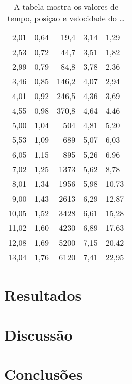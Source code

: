 \documentclass[brazilian,12pt,a4paper,final]{article}
\begin{document}
\begin{table}[h]
\begin{tabular}{||r|r|r||}
2,01    &       0,64    &       19,4    &       3,14    &       1,29    \\
2,53    &       0,72    &       44,7    &       3,51    &       1,82    \\
2,99    &       0,79    &       84,8    &       3,78    &       2,36    \\
3,46    &       0,85    &       146,2   &       4,07    &       2,94    \\
4,01    &       0,92    &       246,5   &       4,36    &       3,69    \\
4,55    &       0,98    &       370,8   &       4,64    &       4,46    \\
5,00    &       1,04    &       504     &       4,81    &       5,20    \\
5,53    &       1,09    &       689     &       5,07    &       6,03    \\
6,05    &       1,15    &       895     &       5,26    &       6,96    \\
7,02    &       1,25    &       1373    &       5,62    &       8,78    \\
8,01    &       1,34    &       1956    &       5,98    &       10,73   \\
9,00    &       1,43    &       2613    &       6,29    &       12,87   \\
10,05   &       1,52    &       3428    &       6,61    &       15,28   \\
11,02   &       1,60    &       4230    &       6,89    &       17,63   \\
12,08   &       1,69    &       5200    &       7,15    &       20,42   \\
13,04   &       1,76    &       6120    &       7,41    &       22,95   \\
 \hline
 \end{tabular}
 \caption{A tabela mostra os valores de tempo, posiçao e velocidade do
{\ldots} }
\end{table}



\section{Resultados}

\section{Discussão}

\section{Conclusões}


\begin{thebibliography}{99}
\end{thebibliography}
\end{document}

